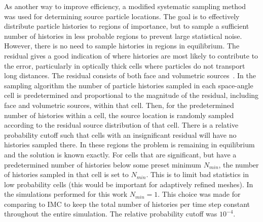 \documentclass{mc2013}
\begin{document}
As another way to improve efficiency, a modified systematic
sampling
method~\cite{shultis_mc} was used for determining source particle locations.  The goal is to effectively distribute particle
histories to regions of importance, but to sample a sufficient number of histories in
less probable regions to prevent large statistical noise.  However, there is no need
to sample histories in regions in equilibrium.
The residual gives a good indication of where
histories are most likely to contribute to the error, particularly in optically thick
cells where particles do not transport long distances.  The residual consists of both face
and volumetric sources~\cite{jake}.   
In the sampling algorithm the number of particle histories sampled in
each space-angle cell is predetermined and proportional to the magnitude of the
residual, including face and volumetric sources, within that cell.  Then, for the predetermined number of histories within a cell, the source
location is randomly sampled according to the residual source distribution of that
cell.  There is
a relative probability cutoff such that cells with an insignificant
residual will have no histories sampled there. In these regions the problem is
remaining in equilibrium and the solution is known exactly.  
For cells that are significant, but have a predetermined number of histories below some preset
minimum $N_{min}$, the number of histories sampled in that cell is set to
$N_{min}$. This is to limit
bad statistics in low probability cells (this would be important for adaptively
refined meshes).  In the simulations performed for this work $N_{min}=1$.  This
choice was made for comparing to IMC to keep the total number of histories per time step
constant throughout the entire simulation. The
relative probability cutoff was $10^{-4}$.

\end{document}
